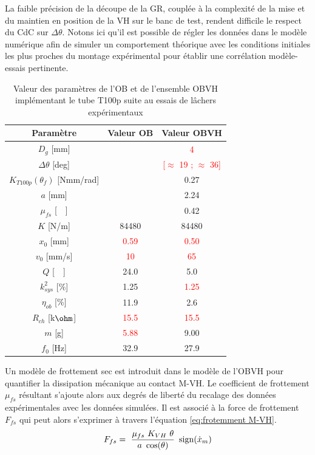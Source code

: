 La faible précision de la découpe de la GR, couplée à la complexité de la mise et du maintien en position de la VH sur le banc de test, rendent difficile le respect du CdC sur $\Delta\theta$. Notons ici qu'il est possible de régler les données dans le modèle numérique afin de simuler un comportement théorique avec les conditions initiales les plus proches du montage expérimental pour établir une corrélation modèle-essais pertinente. 

\begin{table}[!htbp]
	\centering
		\begin{tabular}[t]{|c|c|c|}
\hline
\textbf{Paramètre} & \textbf{Valeur OB} & \textbf{Valeur OBVH}  \\
\hline \hline
$D_g$ [mm] 						& \cellcolor{gray!30} 		& \textcolor{red}{4} 		\\ \hline
$\Delta\theta$ [deg] 			& \cellcolor{gray!30} 		& \textcolor{red}{{[$\approx$ 19 ; $\approx$ 36]}} \\ \hline
$K_{T100p}(\theta_f)$ [Nmm/rad] & \cellcolor{gray!30}  		&  0.27 					\\ \hline
$a$ [mm]         			    & \cellcolor{gray!30}  		&  2.24				 	 	\\ \hline
$\mu_{fs}$ [~~] 				& \cellcolor{gray!30}  		&  0.42  					\\ \hline
$K$ [N/m] 						&	84480			  	 	&  84480  					\\ \hline
$x_0$ [mm] 						& \textcolor{red}{0.59}		& \textcolor{red}{0.50}  	\\ \hline
$v_0$ [mm/s] 					& \textcolor{red}{10}		& \textcolor{red}{65}  		\\ \hline
$Q$	[~~] 						& 		24.0		 		& 5.0     					\\ \hline
$k^2_{sys}$ [\%] 						& 		1.25		 		& \textcolor{red}{1.25}   	\\ \hline
$\eta_{ob}$ [\%] 					& 		11.9		 		& 2.6   					\\ \hline	
$R_{ch}$ [k$\text{\ohm}$] 		&	\textcolor{red}{15.5}	& \textcolor{red}{15.5}    	\\ \hline		
$m$	[g]						    &	\textcolor{red}{5.88}	& 9.00   					\\ \hline	
$f_0$ [Hz]						&		32.9				& 27.9   					\\ \hline	
	\end{tabular}
        \caption{Valeur des paramètres de l'OB et de l'ensemble OBVH implémentant le tube T100p suite au essais de lâchers expérimentaux}
        \label{tab:parametres lacher tube}
\end{table}        
Un modèle de frottement sec est introduit dans le modèle de l'OBVH pour quantifier la dissipation mécanique au contact M-VH. Le coefficient de frottement $\mu_{fs}$ résultant s'ajoute alors aux degrés de liberté du recalage des données expérimentales avec les données simulées. Il est associé à la force de frottement $F_{fs}$ qui peut alors s'exprimer à travers l'équation \ref{eq:frotemment M-VH}.
\begin{equation}
	F_{fs} = \ \frac{\mu_{fs}\ K_{VH}\ \theta}{a\ \cos(\theta)}\ \sign(\dot{x}_m)
	\label{eq:frotemment M-VH}
\end{equation}

